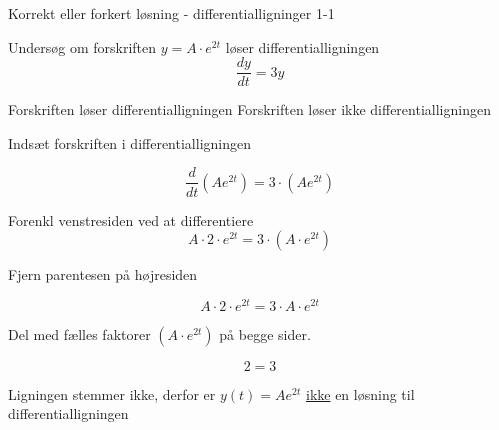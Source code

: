 \documentclass{article}
\begin{document}
\tableofcontents
\newpage

\begin{exercise}{Korrekt eller forkert løsning - differentialligninger 1-1}


Undersøg om forskriften $y = A \cdot e^{2t}$ løser differentialligningen
\[
\frac{dy}{dt} = 3y
\]

\begin{multichoice}
\itemfalse Forskriften løser differentialligningen
\itemtrue Forskriften løser ikke differentialligningen
\end{multichoice}

\hint

Indsæt forskriften i differentialligningen

\hint
\[
\frac{d}{dt} \left( A e^{2t}\right) = 3 \cdot \left( A e^{2t} \right)
\]


\hint

Forenkl venstresiden ved at differentiere
\[
A \cdot 2 \cdot e^{2t} = 3 \cdot \left(A \cdot e^{2t} \right)
\]

\hint

Fjern parentesen på højresiden

\hint
\[
A \cdot 2 \cdot e^{2t} = 3 \cdot A \cdot e^{2t}
\]

\hint
Del med fælles faktorer $\left( A \cdot e^{2t} \right)$ på begge sider.

\hint

\[
2 = 3
\]


\hint

Ligningen stemmer ikke, derfor er $y(t) = A e^{2t}$ \underline{ikke} en løsning til differentialligningen

\end{exercise}

\newpage
\end{document}
